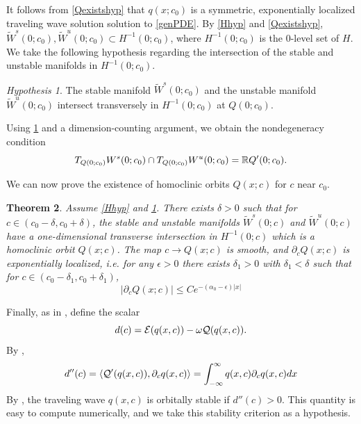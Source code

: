 \documentclass[11pt,reqno]{amsart}
\theoremstyle{plain}
\newtheorem{theorem}{Theorem}
\theoremstyle{definition}
\theoremstyle{remark}
\newtheorem{hypothesis}[theorem]{Hypothesis}
\begin{document}
It follows from \cref{Qexistshyp} that $q(x; c_0)$ is a symmetric, exponentially localized traveling wave solution solution to \cref{genPDE}. By \cref{Hhyp} and \cref{Qexistshyp}, $\tilde{W}^s(0; c_0), \tilde{W}^u(0; c_0) \subset H^{-1}(0; c_0)$, where $H^{-1}(0; c_0)$ is the 0-level set of $H$. We take the following hypothesis regarding the intersection of the stable and unstable manifolds in $H^{-1}(0; c_0)$.

\begin{hypothesis}\label{H0transversehyp}
The stable manifold $\tilde{W}^s(0; c_0)$ and the unstable manifold $\tilde{W}^u(0; c_0)$ intersect transversely in $H^{-1}(0; c_0)$ at $Q(0; c_0)$.
\end{hypothesis}

\noi Using \cref{H0transversehyp} and a dimension-counting argument, we obtain the nondegeneracy condition
\begin{equation}\label{nondegencond}
T_{Q(0; c_0)}W^s(0; c_0) \cap T_{Q(0; c_0)}W^u(0; c_0) = \mathbb{R} Q'(0; c_0).
\end{equation}

We can now prove the existence of homoclinic orbits $Q(x; c)$ for $c$ near $c_0$.

\begin{theorem}\label{transverseint}
Assume \cref{Hhyp} and \cref{H0transversehyp}. There exists $\delta > 0$ such that for $c \in (c_0 - \delta, c_0 + \delta)$, the stable and unstable manifolds $\tilde{W}^s(0; c)$ and $\tilde{W}^u(0; c)$ have a one-dimensional transverse intersection in $H^{-1}(0; c)$ which is a homoclinic orbit $Q(x; c)$. The map $c \rightarrow Q(x; c)$ is smooth, and $\partial_c Q(x; c)$ is exponentially localized, i.e. for any $\epsilon > 0$ there exists $\delta_1 > 0$ with $\delta_1 < \delta$ such that for $c \in (c_0 - \delta_1, c_0 + \delta_1)$,
\begin{equation}\label{Qcbound}
|\partial_c Q(x; c)| \leq C e^{-(\alpha_0 - \epsilon)|x|}
\end{equation}
\end{theorem}

Finally, as in \cite{Grillakis1987}, define the scalar
\begin{equation}
d(c) = \mathcal{E}(q(x, c)) - \omega\mathcal{Q}(q(x, c)).
\end{equation}
By \cite[(2.21)]{Grillakis1987},
\begin{align}\label{ddoubleprime}
d''(c) = \langle \mathcal{Q}'(q(x, c)), \partial_c q(x, c) \rangle
= \int_{-\infty}^\infty q(x, c) \partial_c q(x, c) dx
\end{align}
By \cite[Theorem 3.5]{Grillakis1987}, the traveling wave $q(x, c)$ is orbitally stable if $d''(c) > 0$. This quantity is easy to compute numerically, and we take this stability criterion as a hypothesis.
\end{document}

